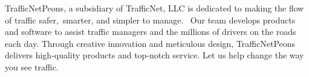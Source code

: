 TrafficNetPeons, a subsidiary of TrafficNet, LLC is dedicated to making the flow of traffic safer, smarter, and simpler to manage.  Our team develops products and software to assist traffic managers and the millions of drivers on the roads each day. Through creative innovation and meticulous design, TrafficNetPeons delivers high-quality products and top-notch service. Let us help change the way you see traffic.
